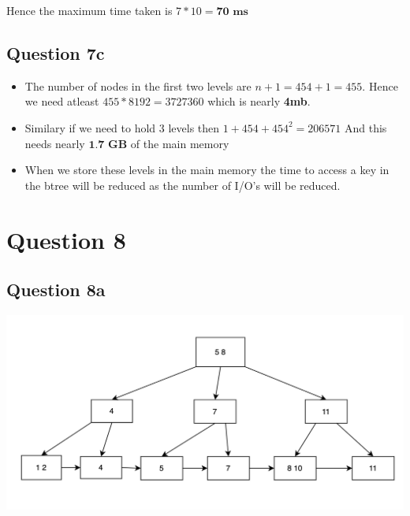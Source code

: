 \documentclass{article}
\begin{document}
  Hence the maximum time taken is $ 7 * 10 = \textbf{70 ms}$

  \subsection*{Question 7c}
  \begin{itemize}
    \item The number of nodes in the first two levels are $ n + 1 = 454 + 1 = 455$. Hence we need atleast $455 * 8192 = 3727360 $ which is nearly {\textbf{4mb}}.
    \item Similary if we need to hold 3 levels then $ 1 + 454 + 454^2 = 206571$ And this needs nearly $\textbf{1.7 GB}$ of the main memory
    \item When we store these levels in the main memory the time to access a key in the btree will be reduced as the number of I/O's will be reduced.
  \end{itemize}
  
  \section*{Question 8}
  \subsection*{Question 8a}
  \includegraphics[scale=0.5]{insert}
\end{document}
